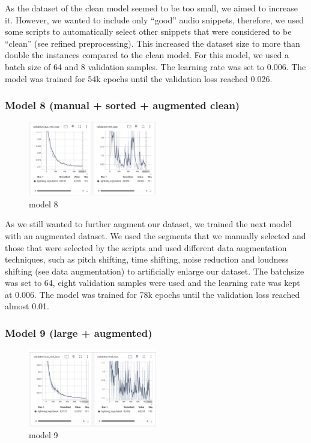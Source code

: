 \documentclass[a4paper]{article}
\begin{document}
	As the dataset of the clean model seemed to be too small, we aimed to increase it. However, we wanted to include only “good” audio snippets, therefore, we used some scripts to automatically select other snippets that were considered to be “clean” (see refined preprocessing). This increased the dataset size to more than double the instances compared to the clean model. For this model, we used a batch size of 64 and 8 validation samples. The learning rate was set to 0.006. The model was trained for 54k epochs until the validation loss reached 0.026.
	
	\subsubsection{Model 8 (manual + sorted + augmented clean)}
	
	\begin{figure}[htbp]
		\centering
		\includegraphics[width=0.5\textwidth]{graphics/v8_testing.png}
		\caption{model 8}
		\label{fig:bild5}
	\end{figure}
	
	As we still wanted to further augment our dataset, we trained the next model with an augmented dataset. We used the segments that we manually selected and those that were selected by the scripts and used different data augmentation techniques, such as pitch shifting, time shifting, noise reduction and loudness shifting (see data augmentation) to artificially enlarge our dataset. The batchsize was set to 64, eight validation samples were used and the learning rate was kept at 0.006. The model was trained for 78k epochs until the validation loss reached almost 0.01.
	
	
	\subsubsection{Model 9 (large + augmented)}
	
	\begin{figure}[htbp]
		\centering
		\includegraphics[width=0.5\textwidth]{graphics/v9_testing.png}
		\caption{model 9}
		\label{fig:bild6}
	\end{figure}
	
\end{document}
